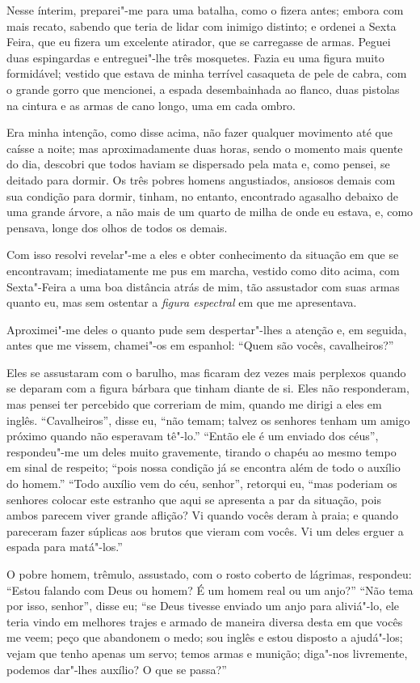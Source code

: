 Nesse ínterim, preparei"-me para uma batalha, como o fizera antes; embora
com mais recato, sabendo que teria de lidar com inimigo distinto; e
ordenei a Sexta Feira, que eu fizera um excelente atirador, que se
carregasse de armas. Peguei duas espingardas e entreguei"-lhe três
mosquetes. Fazia eu uma figura muito formidável; vestido que estava de
minha terrível casaqueta de pele de cabra, com o grande gorro que
mencionei, a espada desembainhada ao flanco, duas pistolas na cintura e
as armas de cano longo, uma em cada ombro.

Era minha intenção, como disse acima, não fazer qualquer movimento até
que caísse a noite; mas aproximadamente duas horas, sendo o momento mais
quente do dia, descobri que todos haviam se dispersado pela mata e, como
pensei, se deitado para dormir. Os três pobres homens angustiados,
ansiosos demais com sua condição para dormir, tinham, no entanto,
encontrado agasalho debaixo de uma grande árvore, a não mais de um
quarto de milha de onde eu estava, e, como pensava, longe dos olhos de
todos os demais.

Com isso resolvi revelar"-me a eles e obter conhecimento da situação em
que se encontravam; imediatamente me pus em marcha, vestido como dito
acima, com Sexta"-Feira a uma boa distância atrás de mim, tão assustador
com suas armas quanto eu, mas sem ostentar a \emph{figura espectral} em
que me apresentava.

Aproximei"-me deles o quanto pude sem despertar"-lhes a atenção e, em
seguida, antes que me vissem, chamei"-os em espanhol: ``Quem são vocês,
cavalheiros?''

Eles se assustaram com o barulho, mas ficaram dez vezes mais perplexos
quando se deparam com a figura bárbara que tinham diante de si. Eles não
responderam, mas pensei ter percebido que correriam de mim, quando me
dirigi a eles em inglês. ``Cavalheiros'', disse eu, ``não temam; talvez
os senhores tenham um amigo próximo quando não esperavam tê"-lo.''
``Então ele é um enviado dos céus'', respondeu"-me um deles muito
gravemente, tirando o chapéu ao mesmo tempo em sinal de respeito; ``pois
nossa condição já se encontra além de todo o auxílio do homem.'' ``Todo
auxílio vem do céu, senhor'', retorqui eu, ``mas poderiam os senhores
colocar este estranho que aqui se apresenta a par da situação, pois
ambos parecem viver grande aflição? Vi quando vocês deram à praia; e
quando pareceram fazer súplicas aos brutos que vieram com vocês. Vi um
deles erguer a espada para matá"-los.''

O pobre homem, trêmulo, assustado, com o rosto coberto de lágrimas,
respondeu: ``Estou falando com Deus ou homem? É um homem real ou um
anjo?'' ``Não tema por isso, senhor'', disse eu; ``se Deus tivesse
enviado um anjo para aliviá"-lo, ele teria vindo em melhores trajes e
armado de maneira diversa desta em que vocês me veem; peço que abandonem
o medo; sou inglês e estou disposto a ajudá"-los; vejam que tenho apenas
um servo; temos armas e munição; diga"-nos livremente, podemos dar"-lhes
auxílio? O que se passa?''

